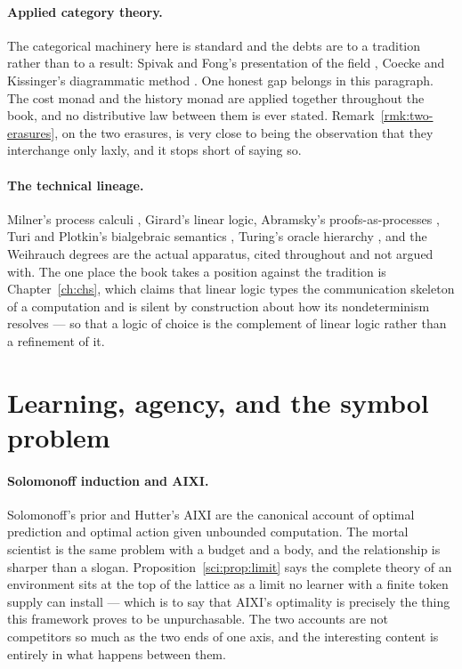\paragraph{Applied category theory.}
The categorical machinery here is standard and the debts are to a
tradition rather than to a result: Spivak and Fong's presentation
of the field \cite{fongspivak2019}, Coecke and Kissinger's
diagrammatic method \cite{coeckekissinger2017}.
One honest gap belongs in this paragraph.
The cost monad and the history monad are applied together
throughout the book, and no distributive law between them is ever
stated.
Remark~\ref{rmk:two-erasures}, on the two erasures, is very close to
being the observation that they interchange only laxly, and it
stops short of saying so.

\paragraph{The technical lineage.}
Milner's process calculi \cite{milnerCC}, Girard's linear logic,
Abramsky's proofs-as-processes \cite{abramskyPaP}, Turi and
Plotkin's bialgebraic semantics \cite{turiplotkin}, Turing's oracle
hierarchy \cite{turing1939}, and the Weihrauch degrees
\cite{weihrauch} are the actual apparatus, cited throughout and not
argued with.
The one place the book takes a position against the tradition is
Chapter~\ref{ch:chs}, which claims that linear logic types the
communication skeleton of a computation and is silent by
construction about how its nondeterminism resolves --- so that a
logic of choice is the complement of linear logic rather than a
refinement of it.

\section*{Learning, agency, and the symbol problem}

\paragraph{Solomonoff induction and AIXI.}
Solomonoff's prior \cite{solomonoff1964} and Hutter's AIXI
\cite{hutter2005} are the canonical account of optimal prediction
and optimal action given unbounded computation.
The mortal scientist is the same problem with a budget and a body,
and the relationship is sharper than a slogan.
Proposition~\ref{sci:prop:limit} says the complete theory of an
environment sits at the top of the lattice as a limit no learner
with a finite token supply can install --- which is to say that
AIXI's optimality is precisely the thing this framework proves to
be unpurchasable.
The two accounts are not competitors so much as the two ends of one
axis, and the interesting content is entirely in what happens
between them.

